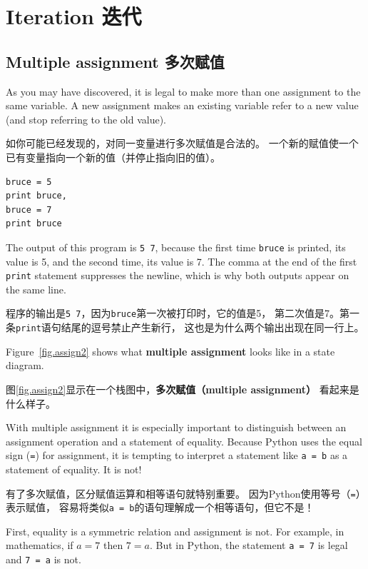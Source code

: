 \documentclass[10pt]{book}
\begin{document}
\begin{CJK}{UTF8}{gbsn}
\begin{exercise}
\end{exercise}


\chapter{Iteration 迭代}

\section{Multiple assignment 多次赋值}

As you may have discovered, it is legal to
make more than one assignment to the same variable.  A
new assignment makes an existing variable refer to a new
value (and stop referring to the old value).

如你可能已经发现的，对同一变量进行多次赋值是合法的。
一个新的赋值使一个已有变量指向一个新的值（并停止指向旧的值）。

\begin{verbatim}
bruce = 5
print bruce,
bruce = 7
print bruce
\end{verbatim}
%
The output of this program is {\tt 5 7}, because the first time
{\tt bruce} is printed, its value is 5, and the second time, its
value is 7.  The
comma at the end of the first {\tt print} statement suppresses
the newline, which is why both outputs
appear on the same line.

程序的输出是{\tt 5 7}，因为{\tt bruce}第一次被打印时，它的值是5，
第二次值是7。第一条{\tt print}语句结尾的逗号禁止产生新行，
这也是为什么两个输出出现在同一行上。

Figure~\ref{fig.assign2} shows what {\bf multiple assignment} looks
like in a state diagram. 

图\ref{fig.assign2}显示在一个栈图中，{\bf 多次赋值（multiple assignment）}
看起来是什么样子。

With multiple assignment it is especially important to distinguish
between an assignment operation and a statement of equality.  Because
Python uses the equal sign ({\tt =}) for assignment, it is tempting to
interpret a statement like {\tt a = b} as a statement of equality. It
is not!

有了多次赋值，区分赋值运算和相等语句就特别重要。
因为Python使用等号（{\tt =}）表示赋值，
容易将类似{\tt a = b}的语句理解成一个相等语句，但它不是！

First, equality is a symmetric relation and assignment is not.  For
example, in mathematics, if $a=7$ then $7=a$.  But in Python, the
statement {\tt a = 7} is legal and {\tt 7 = a} is not.


\end{CJK}
\end{document}
